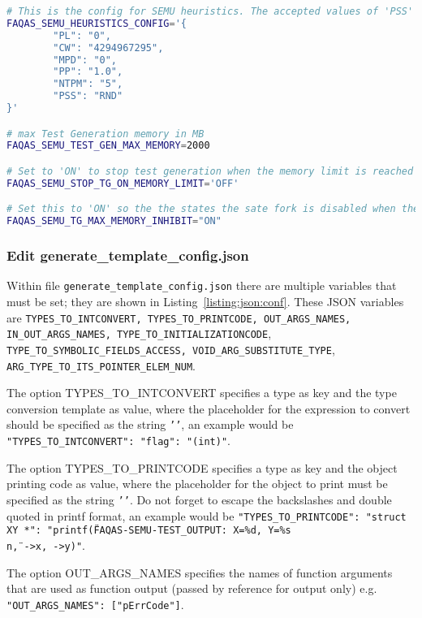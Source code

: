 \begin{lstlisting}[language=bash,label=listing:ASN:conf,caption=faqas\_semus\_conf.sh file for ASN case study.]
# This is the config for SEMU heuristics. The accepted values of 'PSS' are 'RND' for random and 'MDO' for minimum distance to output
FAQAS_SEMU_HEURISTICS_CONFIG='{
        "PL": "0",
        "CW": "4294967295",
        "MPD": "0",
        "PP": "1.0",
        "NTPM": "5",
        "PSS": "RND"
}'

# max Test Generation memory in MB
FAQAS_SEMU_TEST_GEN_MAX_MEMORY=2000

# Set to 'ON' to stop test generation when the memory limit is reached
FAQAS_SEMU_STOP_TG_ON_MEMORY_LIMIT='OFF'

# Set this to 'ON' so the the states the sate fork is disabled when the memory limit is reached, to avoid going much over it
FAQAS_SEMU_TG_MAX_MEMORY_INHIBIT="ON"
\end{lstlisting}


\subsubsection{Edit generate\_template\_config.json}
\label{sec:json_config}

Within file \texttt{generate\_template\_config.json} there are multiple variables that must be set; they are shown in Listing~\ref{listing:json:conf}. These JSON variables are \texttt{TYPES\_TO\_INTCONVERT, TYPES\_TO\_PRINTCODE, OUT\_ARGS\_NAMES, IN\_OUT\_ARGS\_NAMES, TYPE\_TO\_INITIALIZATIONCODE}, \\ 
\texttt{TYPE\_TO\_SYMBOLIC\_FIELDS\_ACCESS, VOID\_ARG\_SUBSTITUTE\_TYPE},\\ 
\texttt{ARG\_TYPE\_TO\_ITS\_POINTER\_ELEM\_NUM}.

The option TYPES\_TO\_INTCONVERT specifies a type as key and the type conversion template as value, where the placeholder for the expression to convert should be specified as the string \texttt{'{}'}, an example would be \texttt{"TYPES\_TO\_INTCONVERT": {"flag": "(int){}"}}.

The option TYPES\_TO\_PRINTCODE specifies a type as key and the object printing code as value, where the placeholder for the object to print must be specified as the string \texttt{'{}'}. Do not forget to escape the backslashes and double quoted in printf format, an example would be \texttt{"TYPES\_TO\_PRINTCODE": {"struct XY *": "printf(\"FAQAS-SEMU-TEST\_OUTPUT: X=\%d, Y=\%s\\n\", {}->x, {}->y)"}}.

The option OUT\_ARGS\_NAMES specifies the names of function arguments that are used as function output (passed by reference for output only) e.g. \texttt{"OUT\_ARGS\_NAMES": ["pErrCode"]}.

